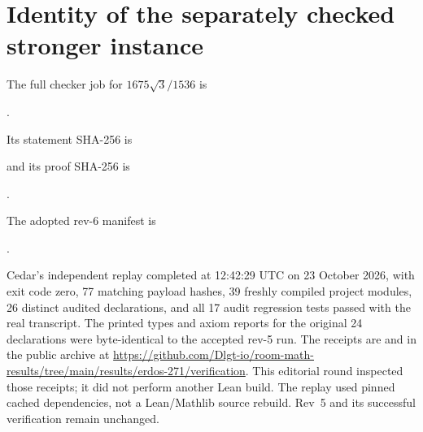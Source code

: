 \documentclass[11pt]{article}
\begin{document}
\section{Identity of the separately checked stronger instance}
The full checker job for $1675\sqrt3/1536$ is
\par\noindent{}.\par
Its statement SHA-256 is
\par\noindent{}\par
and its proof SHA-256 is
\par\noindent{}.\par
The adopted rev-6 manifest is
\par\noindent{}.\par
Cedar's independent replay completed at 12:42:29 UTC on 23 October 2026,
with exit code zero, 77 matching payload hashes, 39 freshly compiled project
modules, 26 distinct audited declarations, and all 17 audit regression tests
passed with the real transcript. The printed types and axiom reports for the
original 24 declarations were byte-identical to the accepted rev-5 run.
The receipts are  and
 in the public archive at
\url{https://github.com/Dlgt-io/room-math-results/tree/main/results/erdos-271/verification}.
This editorial round
inspected those receipts; it did not perform another Lean build.
The replay used pinned cached dependencies, not a Lean/Mathlib source rebuild.
Rev~5 and its successful verification remain unchanged.
\end{document}
